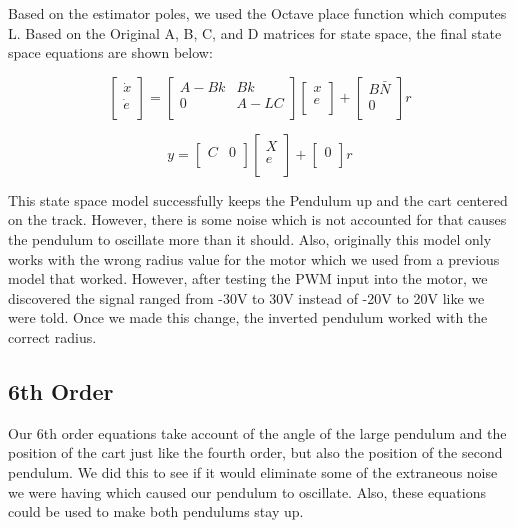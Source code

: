 \documentclass{article}
\begin{document}
Based on the estimator poles, we used the Octave place function which computes L. Based on the Original A, B, C, and D matrices for state space, the final state space equations are shown below:

\begin{equation}
\label{ss3}
\begin{bmatrix}
\dot{x}\\
\dot{e}\\
\end{bmatrix}
=
\begin{bmatrix}
A-Bk&Bk\\
0&A-LC\\
\end{bmatrix}
\begin{bmatrix}
x\\
e\\
\end{bmatrix} +
\begin{bmatrix}
B\bar{N}\\
0\\
\end{bmatrix} r
\end{equation}

\begin{equation}
\label{ss4}
y = 
\begin{bmatrix}
C&0\\
\end{bmatrix}
\begin{bmatrix}
X\\
e\\
\end{bmatrix} +
\begin{bmatrix}
0\\
\end{bmatrix} r
\end{equation}

This state space model successfully keeps the Pendulum up and the cart centered on the track. However, there is some noise which is not accounted for that causes the pendulum to oscillate more than it should. Also, originally this model only works with the wrong radius value for the motor which we used from a previous model that worked. However, after testing the PWM input into the motor, we discovered the signal ranged from -30V to 30V instead of -20V to 20V like we were told. Once we made this change, the inverted pendulum worked with the correct radius.

\subsection{6th Order}
Our 6th order equations take account of the angle of the large pendulum and the position of the cart just like the fourth order, but also the position of the second pendulum. We did this to see if it would eliminate some of the extraneous noise we were having which caused our pendulum to oscillate. Also, these equations could be used to make both pendulums stay up. 
\end{document}
